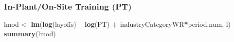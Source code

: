 \documentclass[
]{article}
\newenvironment{Shaded}{\begin{snugshade}}{\end{snugshade}}
\newcommand{\KeywordTok}[1]{\textcolor[rgb]{0.13,0.29,0.53}{\textbf{#1}}}
\newcommand{\NormalTok}[1]{#1}
\newcommand{\OperatorTok}[1]{\textcolor[rgb]{0.81,0.36,0.00}{\textbf{#1}}}
\newcommand{\StringTok}[1]{\textcolor[rgb]{0.31,0.60,0.02}{#1}}
\begin{document}
\hypertarget{in-planton-site-training-pt-3}{%
\subsubsection{In-Plant/On-Site Training
(PT)}\label{in-planton-site-training-pt-3}}

\begin{Shaded}
\begin{Highlighting}[]
\NormalTok{lmod <-}\StringTok{ }\KeywordTok{lm}\NormalTok{(}\KeywordTok{log}\NormalTok{(layoffs) }\OperatorTok{~}\StringTok{ }\KeywordTok{log}\NormalTok{(PT) }\OperatorTok{+}\StringTok{ }\NormalTok{industryCategoryWR}\OperatorTok{*}\NormalTok{period.num, l)}
\KeywordTok{summary}\NormalTok{(lmod)}
\end{Highlighting}
\end{Shaded}
\end{document}
